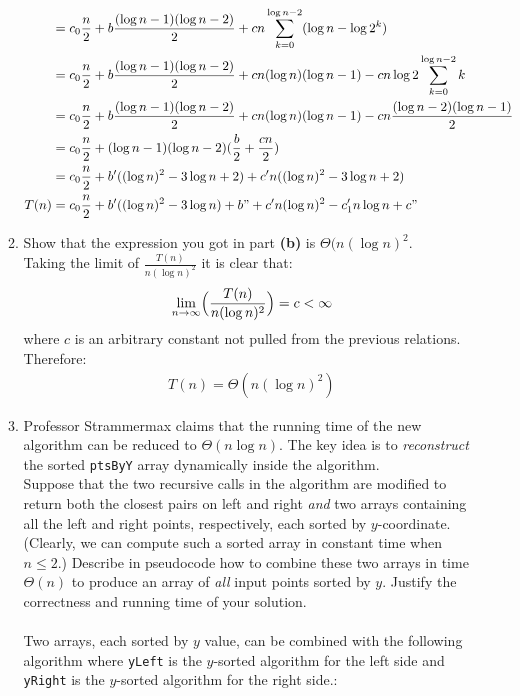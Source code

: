 \documentclass[11pt]{article}
\begin{document}
\begin{enumerate}
\begin{enumerate}
\begin{align*}
\\&= c_0 \frac{n}{2} + b \frac{(\log n-1)(\log n -2)}{2} + cn\sum_{k=0}^{\log n-2}(\log n - \log{2^k})
\\&=c_0 \frac{n}{2} + b \frac{(\log n-1)(\log n -2)}{2} + cn(\log n) (\log n -1)- cn \log 2 \sum_{k=0}^{\log n-2} k
\\&=c_0 \frac{n}{2} + b \frac{(\log n-1)(\log n -2)}{2} + cn(\log n) (\log n -1)- cn\frac{(\log n -2)(\log n -1)}{2}
\\&= c_0 \frac{n}{2} +(\log n-1)(\log n -2)(\frac{b}{2}+ \frac{cn}{2})
\\&= c_0 \frac{n}{2} + b'((\log n)^2 - 3 \log n +2)+c'n((\log n)^2 - 3 \log n +2)
\\T(n)&= c_0 \frac{n}{2} + b'((\log n)^2 - 3 \log n)+b" + c'n(\log n)^2 - c_1'n \log n + c"
\end{align*}
\newpage
\item Show that the expression you got in part \textbf{(b)} is $\Theta(n (\log n)^2$.\\
Taking the limit of $\frac{T(n)}{n (\log n)^2}$ it is clear that:
\begin{align*}
\lim_{n \to \infty} \Bigl( \frac{T(n)}{n(\log n)^2} \Bigr)= c < \infty
\end{align*}
where $c$ is an arbitrary constant not pulled from the previous relations.  Therefore:
\begin{align*}
T(n) =  \Theta(n (\log n)^2)
\end{align*}
\item Professor Strammermax claims that the running time of the new algorithm can be reduced to $\Theta( n \log n)$.  The key idea is to \textit{reconstruct} the sorted \texttt{ptsByY} array dynamically inside the algorithm.\\
Suppose that the two recursive calls in the algorithm are modified to return both the closest pairs on left and right \textit{and} two arrays containing all the left and right points, respectively, each sorted by $y$-coordinate.  (Clearly, we can compute such a sorted array in constant time when $n \leq 2$.)  Describe in pseudocode how to combine these two arrays in time $\Theta(n)$ to produce an array of \textit{all} input points sorted by $y$. Justify the correctness and running time of your solution.
\\
\\
Two arrays, each sorted by $y$ value, can be combined with the following algorithm where \texttt{yLeft} is the $y$-sorted algorithm for the left side and \texttt{yRight} is the $y$-sorted algorithm for the right side.:

\end{enumerate}
\end{enumerate}
\end{document}
